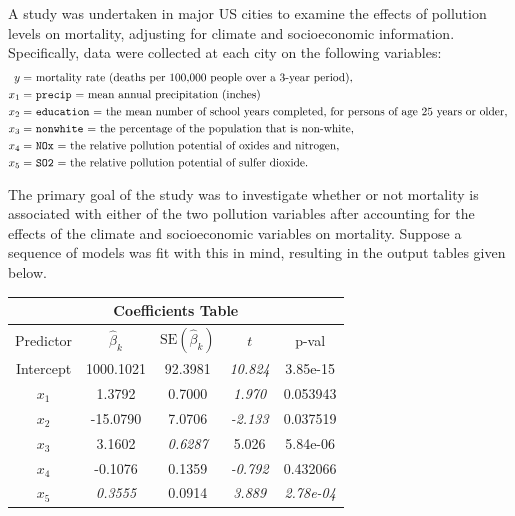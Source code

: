 \documentclass{homework}
\begin{document}
\begin{longproblem}
  A study was undertaken in major US cities to examine the effects of pollution levels on mortality, adjusting for climate and socioeconomic information.  Specifically, data were collected at each city on the following variables:
\begin{align*}
  y   = &\text{ mortality rate (deaths per 100,000 people over a 3-year period), }\\
  x_1 = &\text{ \texttt{precip} = mean annual precipitation (inches) }\\
  x_2 = &\text{ \texttt{education} = the mean number of school years completed, for persons of age 25 years or older, }\\
  x_3 = &\text{ \texttt{nonwhite} = the percentage of the population that is non-white, }\\
  x_4 = &\text{ \texttt{NOx} = the relative pollution potential of oxides and nitrogen, }\\
  x_5 = &\text{ \texttt{SO2} = the relative pollution potential of sulfer dioxide. }\\
\end{align*}

The primary goal of the study was to investigate whether or not mortality is associated with either of the two pollution variables after accounting for the effects of the climate and socioeconomic variables on mortality.  Suppose a sequence of models was fit with this in mind, resulting in the output tables given below.

{\small
\renewcommand{\a}[1]{{\color{red} \it #1}}
\begin{minipage}{.50\textwidth}
\begin{tabular}{c c c c c}
\multicolumn{5}{c}{\bf Coefficients Table} \\ \hline
Predictor & $\hat \beta_k$ & $\mathrm{SE}(\hat \beta_k)$ & $t$ & p-val \\ \hline
Intercept & 1000.1021 & 92.3981  & \a{10.824} & 3.85e-15   \\
$x_1$     & 1.3792    & 0.7000   & \a{1.970 } & 0.053943   \\ 
$x_2$     & -15.0790  & 7.0706   & \a{-2.133} & 0.037519   \\
$x_3$     & 3.1602    &\a{0.6287}&    5.026   & 5.84e-06   \\
$x_4$     & -0.1076   & 0.1359   & \a{-0.792} & 0.432066   \\ 
$x_5$     &\a{0.3555} & 0.0914   & \a{3.889}  &\a{2.78e-04}\\ \hline


\end{tabular}
\end{minipage}}
\end{longproblem}
\end{document}
